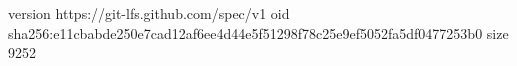 version https://git-lfs.github.com/spec/v1
oid sha256:e11cbabde250e7cad12af6ee4d44e5f51298f78c25e9ef5052fa5df0477253b0
size 9252
